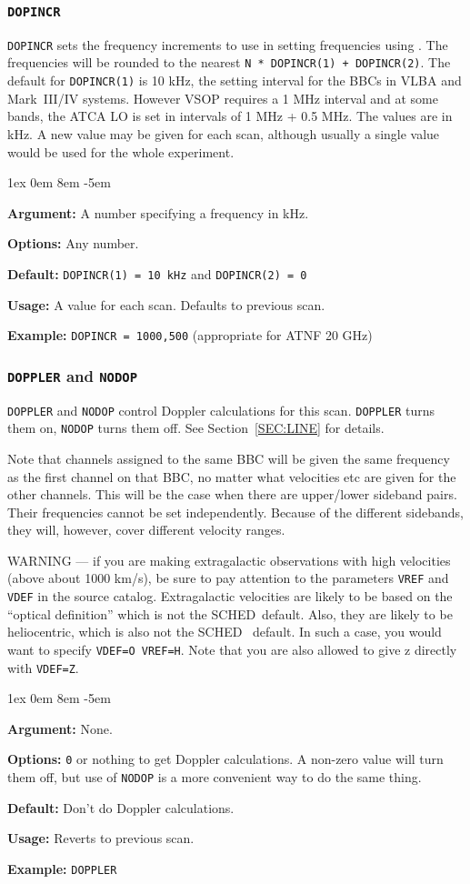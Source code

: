 \documentclass{report}
\newcommand{\schedb}{{\sc SCHED~}}
\newcommand{\rcwbox}[5]{
  \begin{list}{}{\parsep 1ex  \itemsep 0em
                 \leftmargin 8em  \itemindent -5em }
    \item {\bf Argument:} #1
    \item {\bf Options:}  #2
    \item {\bf Default:}  #3
    \item {\bf Usage:}    #4
    \item {\bf Example:}  #5
  \end{list}
}
\begin{document}
\subsubsection{\label{MP:DOPINCR}{\tt DOPINCR}}

{\tt DOPINCR} sets the frequency increments to use in setting
frequencies using .  The
frequencies will be rounded to the nearest {\tt N * DOPINCR(1) +
DOPINCR(2)}.  The default for {\tt DOPINCR(1)} is 10 kHz, the setting
interval for the BBCs in VLBA and Mark~III/IV systems.  However VSOP
requires a 1 MHz interval and at some bands, the ATCA LO is set in
intervals of 1 MHz + 0.5 MHz.  The values are in kHz.  A new value may be
given for each scan, although usually a single value would be used for
the whole experiment.

\rcwbox
{A number specifying a frequency in kHz.}
{Any number.}
{{\tt DOPINCR(1) = 10 kHz} and {\tt DOPINCR(2) = 0}}
{A value for each scan.  Defaults to previous scan.}
{{\tt DOPINCR = 1000,500} (appropriate for ATNF 20 GHz)}


\subsubsection{\label{MP:DOPPLER}{\tt DOPPLER} and {\tt NODOP}}

{\tt DOPPLER} and {\tt NODOP} control Doppler calculations for this
scan.  {\tt DOPPLER} turns them on, {\tt NODOP} turns them off.
See Section~\ref{SEC:LINE} for details.

Note that channels assigned to the same BBC will be given the same
frequency as the first channel on that BBC, no matter what velocities
etc are given for the other channels.  This will be the case when
there are upper/lower sideband pairs.  Their frequencies cannot
be set independently.  Because of the different sidebands, they
will, however, cover different velocity ranges.

WARNING --- if you are making extragalactic observations with high
velocities (above about 1000 km/s), be sure to pay attention to the
parameters {\tt VREF} and {\tt VDEF} in the source catalog.
Extragalactic velocities are likely to be based on the ``optical
definition'' which is not the \schedb default.  Also, they are likely
to be heliocentric, which is also not the \schedb
default.  In such a case, you would want to specify {\tt VDEF=O
VREF=H}.  Note that you are also allowed to give z directly with
{\tt VDEF=Z}.

\rcwbox
{None.}
{{\tt 0} or nothing to get Doppler calculations. A non-zero value will
turn them off, but use of {\tt NODOP} is a more convenient way to
do the same thing.}
{Don't do Doppler calculations.}
{Reverts to previous scan.}
{{\tt DOPPLER}}
\end{document}
